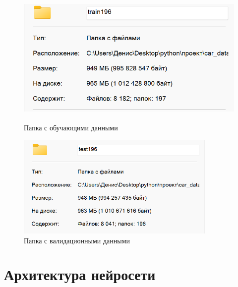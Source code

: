 \documentclass[14pt]{extarticle}
\begin{document}
\begin{figure}[H]
\centering
\begin{minipage}{0.49\textwidth}
  \centering
  \includegraphics[height=6cm]{images/4.png}  
  \caption{Папка с обучающими данными}
  \label{fig:12}
\end{minipage}
\hfill
\begin{minipage}{0.49\textwidth}
  \centering
  \includegraphics[height=5cm]{images/5.png}  
  \caption{Папка с валидационными данными}
  \label{fig:13}
\end{minipage}
\end{figure}

\section{Архитектура нейросети}
\end{document}
